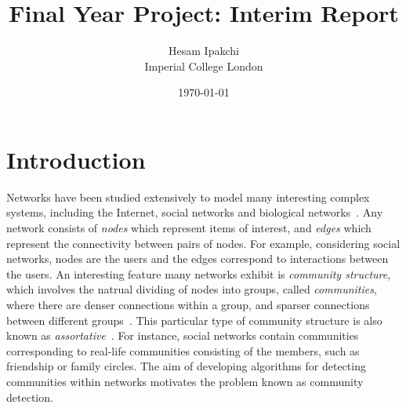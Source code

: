 \documentclass[12pt]{article}
\numberwithin{equation}{section}
\begin{document}
\nocite{*}


\title{\textbf{Final Year Project: Interim Report}}
\author{Hesam Ipakchi\\Imperial College London}
\date{\today}
\maketitle


\newpage
\thispagestyle{plain}
\mbox{}
\tableofcontents


\newpage
\thispagestyle{plain}
\mbox{}
\listoffigures


\newpage
\thispagestyle{plain}
\mbox{}
\section {Introduction}
\label{sec:introduction}

Networks have been studied extensively to model many interesting complex systems, including the Internet, social networks and biological networks~\cite{New06a,DKM+13}. Any network consists of \textit{nodes} which represent items of interest, and \textit{edges} which represent the connectivity between pairs of nodes. For example, considering social networks, nodes are the users and the edges correspond to interactions between the users. An interesting feature many networks exhibit is \textit{community structure}, which involves the natrual dividing of nodes into groups, called \textit{communities}, where there are denser connections within a group, and sparser connections between different groups~\cite{New06a,DKM+13,For10,New06b}. This particular type of community structure is also known as \textit{assortative}~\cite{DKM+13}. For instance, social networks contain communities corresponding to real-life communities consisting of the members, such as friendship or family circles. The aim of developing algorithms for detecting communities within networks motivates the problem known as community detection.
\end{document}
